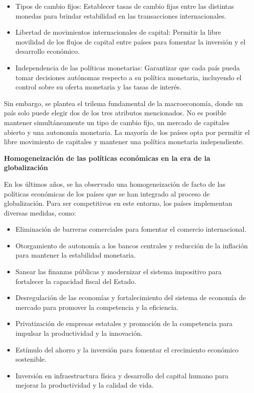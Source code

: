 \documentclass[
  a4paper,
]{article}
\begin{document}
\begin{itemize}
\item
  Tipos de cambio fijos: Establecer tasas de cambio fijas entre las
  distintas monedas para brindar estabilidad en las transacciones
  internacionales.
\item
  Libertad de movimientos internacionales de capital: Permitir la libre
  movilidad de los flujos de capital entre países para fomentar la
  inversión y el desarrollo económico.
\item
  Independencia de las políticas monetarias: Garantizar que cada país
  pueda tomar decisiones autónomas respecto a su política monetaria,
  incluyendo el control sobre su oferta monetaria y las tasas de
  interés.
\end{itemize}

Sin embargo, se plantea el trilema fundamental de la macroeconomía,
donde un país solo puede elegir dos de los tres atributos mencionados.
No es posible mantener simultáneamente un tipo de cambio fijo, un
mercado de capitales abierto y una autonomía monetaria. La mayoría de
los países opta por permitir el libre movimiento de capitales y mantener
una política monetaria independiente.

\textbf{Homogeneización de las políticas económicas en la era de la
globalización}

En los últimos años, se ha observado una homogeneización de facto de las
políticas económicas de los países que se han integrado al proceso de
globalización. Para ser competitivos en este entorno, los países
implementan diversas medidas, como:

\begin{itemize}
\item
  Eliminación de barreras comerciales para fomentar el comercio
  internacional.
\item
  Otorgamiento de autonomía a los bancos centrales y reducción de la
  inflación para mantener la estabilidad monetaria.
\item
  Sanear las finanzas públicas y modernizar el sistema impositivo para
  fortalecer la capacidad fiscal del Estado.
\item
  Desregulación de las economías y fortalecimiento del sistema de
  economía de mercado para promover la competencia y la eficiencia.
\item
  Privatización de empresas estatales y promoción de la competencia para
  impulsar la productividad y la innovación.
\item
  Estímulo del ahorro y la inversión para fomentar el crecimiento
  económico sostenible.
\item
  Inversión en infraestructura física y desarrollo del capital humano
  para mejorar la productividad y la calidad de vida.
\end{itemize}
\end{document}
